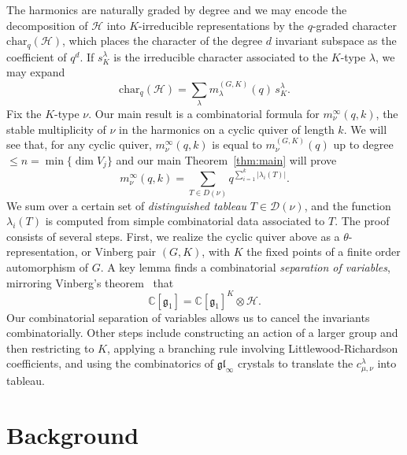 \documentclass[11pt]{article}
\theoremstyle{definition}
\numberwithin{equation}{section}
\newcommand{\C}{\mathbb{C}}
\newcommand{\Ha}{\mathcal{H}}
\newcommand{\g}{\mathfrak{g}}
\newcommand{\gl}{\mathfrak{gl}}
\begin{document}
The harmonics are naturally graded by degree and we may encode the decomposition of $\Ha$ into $K$-irreducible representations by the $q$-graded character $\text{char}_q(\Ha)$, which places the character of the degree $d$ invariant subspace as the coefficient of $q^d$. If $s_K^\lambda$ is the irreducible character associated to the $K$-type $\lambda$, we may expand
\begin{equation*}
    \text{char}_q(\Ha) = \sum_\lambda m_\lambda^{(G,K)}(q) \, s_K^\lambda.
\end{equation*}
Fix the $K$-type $\nu$. Our main result is a combinatorial formula for $m_\nu^\infty(q,k)$, the stable multiplicity of $\nu$ in the harmonics on a cyclic quiver of length $k$. We will see that, for any cyclic quiver, $m_\nu^\infty(q,k)$ is equal to $m_\nu^{(G,K)}(q)$ up to degree $\leq n = \min \{ \dim V_j \}$ and our main Theorem~\ref{thm:main} will prove
$$m_\nu^\infty(q,k) = \sum_{T \in D(\nu)} q^{\sum_{i=1}^k |\lambda_i(T)|}.$$
We sum over a certain set of \textit{distinguished tableau} $T \in \mathcal{D}(\nu)$, and the function $\lambda_i(T)$ is computed from simple combinatorial data associated to $T$. The proof consists of several steps. First, we realize the cyclic quiver above as a $\theta$-representation, or Vinberg pair $(G,K)$, with $K$ the fixed points of a finite order automorphism of $G$. A key lemma finds a combinatorial \textit{separation of variables}, mirroring Vinberg's theorem~\cite{Vinberg1976} that
\begin{equation*}
    \C[\g_1] = \C[\g_1]^K \otimes \Ha.
\end{equation*}
Our combinatorial separation of variables allows us to cancel the invariants combinatorially. Other steps include constructing an action of a larger group and then restricting to $K$, applying a branching rule involving Littlewood-Richardson coefficients, and using the combinatorics of $\gl_\infty$ crystals to translate the $c^\lambda_{\mu,\nu}$ into tableau.

\section{Background}
\end{document}
